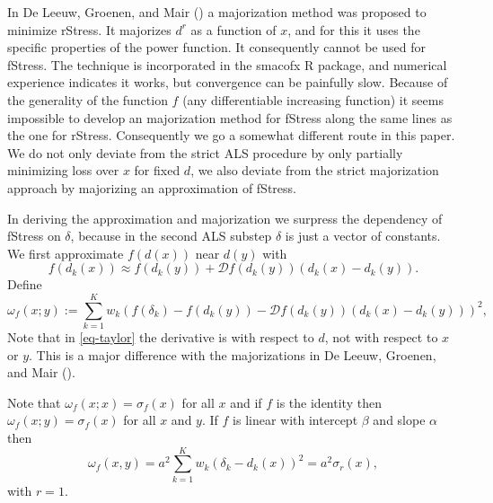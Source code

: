 \documentclass[
  12pt,
  letterpaper,
  DIV=11,
  numbers=noendperiod]{scrartcl}
\begin{document}
In De Leeuw, Groenen, and Mair
() a majorization method
was proposed to minimize rStress. It majorizes \(d^r\) as a function of
\(x\), and for this it uses the specific properties of the power
function. It consequently cannot be used for fStress. The technique is
incorporated in the smacofx R package, and numerical experience
indicates it works, but convergence can be painfully slow. Because of
the generality of the function \(f\) (any differentiable increasing
function) it seems impossible to develop an majorization method for
fStress along the same lines as the one for rStress. Consequently we go
a somewhat different route in this paper. We do not only deviate from
the strict ALS procedure by only partially minimizing loss over \(x\)
for fixed \(d\), we also deviate from the strict majorization approach
by majorizing an approximation of fStress.

In deriving the approximation and majorization we surpress the
dependency of fStress on \(\delta\), because in the second ALS substep
\(\delta\) is just a vector of constants. We first approximate
\(f(d(x))\) near \(d(y)\) with \begin{equation}
f(d_k(x))\approx f(d_k(y))+\mathcal{D}f(d_k(y))(d_k(x)-d_k(y)).\label{eq-taylor}
\end{equation} Define \begin{equation}
\omega_f(x;y):=\sum_{k=1}^K w_k(f(\delta_k)-f(d_k(y))-\mathcal{D}f(d_k(y))(d_k(x)-d_k(y)))^2,\label{eq-defeta}
\end{equation} Note that in \eqref{eq-taylor} the derivative is with
respect to \(d\), not with respect to \(x\) or \(y\). This is a major
difference with the majorizations in De Leeuw, Groenen, and Mair
().

Note that \(\omega_f(x;x)=\sigma_f(x)\) for all \(x\) and if \(f\) is
the identity then \(\omega_f(x;y)=\sigma_f(x)\) for all \(x\) and \(y\).
If \(f\) is linear with intercept \(\beta\) and slope \(\alpha\) then
\begin{equation}
\omega_f(x,y)=a^2\sum_{k=1}^Kw_k(\delta_k-d_k(x))^2=a^2\sigma_r(x),\label{eq-linear}
\end{equation} with \(r=1\).
\end{document}
